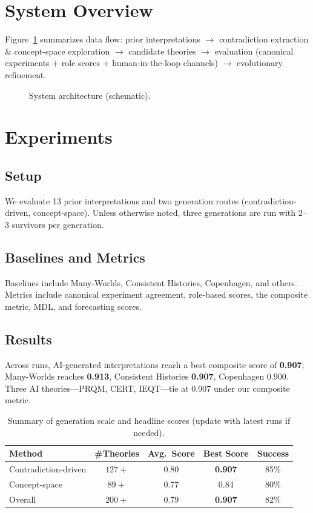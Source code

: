 \documentclass[11pt]{article}
\begin{document}
\section{System Overview}
Figure~\ref{fig:arch} summarizes data flow: prior interpretations $\rightarrow$ contradiction extraction \& concept-space exploration $\rightarrow$ candidate theories $\rightarrow$ evaluation (canonical experiments + role scores + human-in-the-loop channels) $\rightarrow$ evolutionary refinement.
\begin{figure}[h]
\centering
{}
\caption{System architecture (schematic).}
\label{fig:arch}
\end{figure}

\section{Experiments}
\subsection{Setup}
We evaluate 13 prior interpretations and two generation routes (contradiction-driven, concept-space). Unless otherwise noted, three generations are run with 2--3 survivors per generation.
\subsection{Baselines and Metrics}
Baselines include Many-Worlds, Consistent Histories, Copenhagen, and others. Metrics include canonical experiment agreement, role-based scores, the composite metric, MDL, and forecasting scores.
\subsection{Results}
Across runs, AI-generated interpretations reach a best composite score of \textbf{0.907}; Many-Worlds reaches \textbf{0.913}, Consistent Histories \textbf{0.907}, Copenhagen 0.900. 
Three AI theories---PRQM, CERT, IEQT---tie at 0.907 under our composite metric.
\begin{table}[h]
\centering
\small
\caption{Summary of generation scale and headline scores (update with latest runs if needed).}
\label{tab:summary}
\begin{tabular}{lcccc}
\toprule
Method & \#Theories & Avg.\ Score & Best Score & Success \\
\midrule
Contradiction-driven & $127{+}$ & 0.80 & \textbf{0.907} & 85\% \\
Concept-space        & $89{+}$  & 0.77 & 0.84 & 80\% \\
Overall              & $200{+}$ & 0.79 & \textbf{0.907} & 82\% \\
\bottomrule
\end{tabular}
\end{table}
\end{document}
